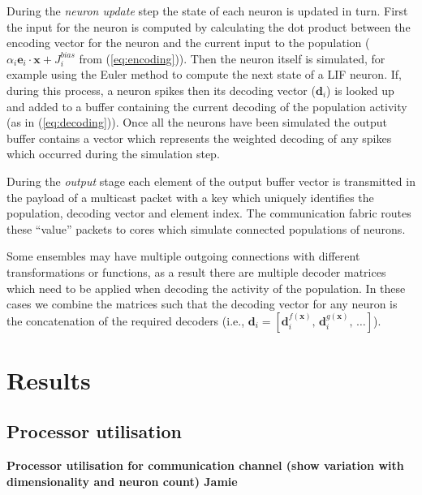 \documentclass[conference]{IEEEtran}
\renewcommand{\vec}{\mathbf}  %
\begin{document}
  During the \textit{neuron update} step the state of each neuron is updated in turn.
  First the input for the neuron is computed by calculating the dot product between the encoding vector for the neuron and the current input to the population ($\alpha_i \vec{e}_i \cdot \vec{x} + J^{bias}_i$ from (\ref{eq:encoding})).
  Then the neuron itself is simulated, for example using the Euler method to compute the next state of a LIF neuron.
  If, during this process, a neuron spikes then its decoding vector ($\vec{d}_i$) is looked up and added to a buffer containing the current decoding of the population activity (as in (\ref{eq:decoding})).
  Once all the neurons have been simulated the output buffer contains a vector which represents the weighted decoding of any spikes which occurred during the simulation step.

  During the \textit{output} stage each element of the output buffer vector is transmitted in the payload of a multicast packet with a key which uniquely identifies the population, decoding vector and element index.
  The communication fabric routes these ``value'' packets to cores which simulate connected populations of neurons.

  Some ensembles may have multiple outgoing connections with different transformations or functions, as a result there are multiple decoder matrices which need to be applied when decoding the activity of the population.
  In these cases we combine the matrices such that the decoding vector for any neuron is the concatenation of the required decoders
  (i.e., $\vec{d}_i = \left[\vec{d}_i^{f(\vec{x})},\,\vec{d}_i^{g(\vec{x})},\,\ldots \right]$).

  \section{Results}
  \label{sec:results}

  \subsection{Processor utilisation}

  \textbf{Processor utilisation for communication channel (show variation with dimensionality and neuron count) \color{red} Jamie}
\end{document}
